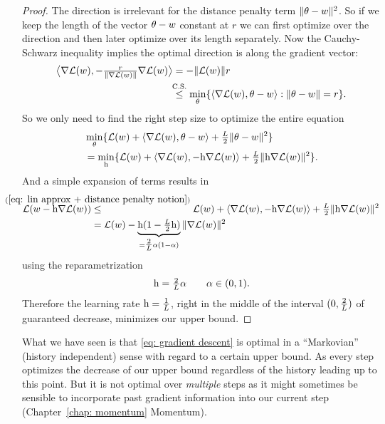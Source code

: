 \begin{proof}
	The direction is irrelevant for the distance penalty term \(\|\theta-w\|^2\).
	So if we keep the length of the vector \(\theta-w\) constant at \(r\)
	we can first optimize over the direction and then later optimize over its
	length separately. Now the Cauchy-Schwarz inequality implies the optimal
	direction is along the gradient vector:
	\begin{align*}
		\big\langle 
			\nabla\Loss(\weights),
			-\tfrac{r}{\|\nabla\Loss(\weights)\|}\nabla\Loss(\weights)
		\big\rangle
		&= - \|\Loss(\weights)\| r\\
		&\lxle{\text{C.S.}}
		\min_{\theta} \{\langle \nabla \Loss(\weights), \theta-\weights \rangle : \|\theta-\weights\|=r \}.
	\end{align*}
	So we only need to find the right step size to optimize the entire equation
	\begin{align*}
		&\min_{\theta} \{
			\mathcal{L}(w)+ \langle\nabla \mathcal{L}(w), \theta-w\rangle
			+ \tfrac{L}{2}\|\theta-w\|^2 
		\} \\
		&= \min_{\text{h}} \{ \mathcal{L}(w) + \langle \nabla \mathcal{L}(w), -\text{h} \nabla \mathcal{L}(w)\rangle
		+ \tfrac{L}{2}\|\text{h}\nabla \mathcal{L}(w)\|^2\}.
	\end{align*}
	And a simple expansion of terms results in
	\begin{align*}
		\Loss(\weights-\lr\nabla\Loss(\weights))
		&\lxle{(\ref{eq: lin approx + distance penalty notion})}
		\Loss(\weights) + \langle \nabla \Loss(\weights), -\lr \nabla \Loss(\weights)\rangle
		+ \tfrac{\ubound}{2}\|\lr\nabla \Loss(\weights)\|^2\\
		&=\Loss(\weights) - \underbrace{\lr(1-\tfrac{\ubound}2\lr)}_{=\tfrac{2}{\ubound}\alpha(1-\alpha)}\|\nabla\Loss(\weights)\|^2
	\end{align*}
	using the reparametrization
	\begin{align*}
		\text{h}=\tfrac{2}{L}\alpha\qquad \alpha \in (0,1).
	\end{align*}
	Therefore the learning rate \(\text{h}=\tfrac1{L}\), right in the middle of the
	interval \((0, \tfrac2{L})\) of guaranteed decrease, minimizes our upper bound.
\end{proof}
\begin{remark}
	What we have seen is that \ref{eq: gradient descent} is optimal in a ``Markovian''
	(history independent) sense with regard to a certain upper bound. As every
	step optimizes the decrease of our upper bound regardless of the history
	leading up to this point. But it is not optimal over \emph{multiple} steps as
	it might sometimes be sensible to incorporate past gradient information into
	our current step (Chapter~\ref{chap: momentum} Momentum).
\end{remark}


